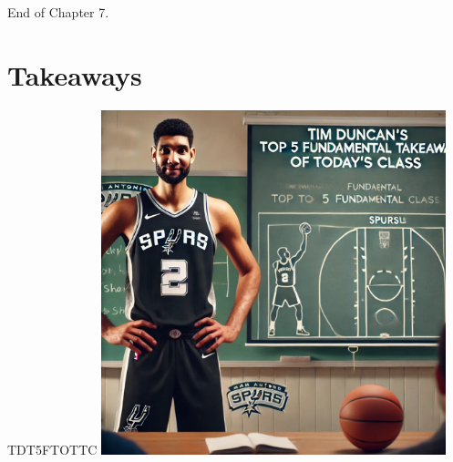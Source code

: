 \documentclass{beamer}
\begin{document}
\begin{frame}{}
\end{frame}


\begin{frame}{}
     \centering
     \Huge End of Chapter 7.
\end{frame}

\section*{Takeaways}

\begin{frame}{TDT5FTOTTC}
    \centering
    \includegraphics[width=0.75\textwidth]{figures/tim.png}
\end{frame}
\end{document}
